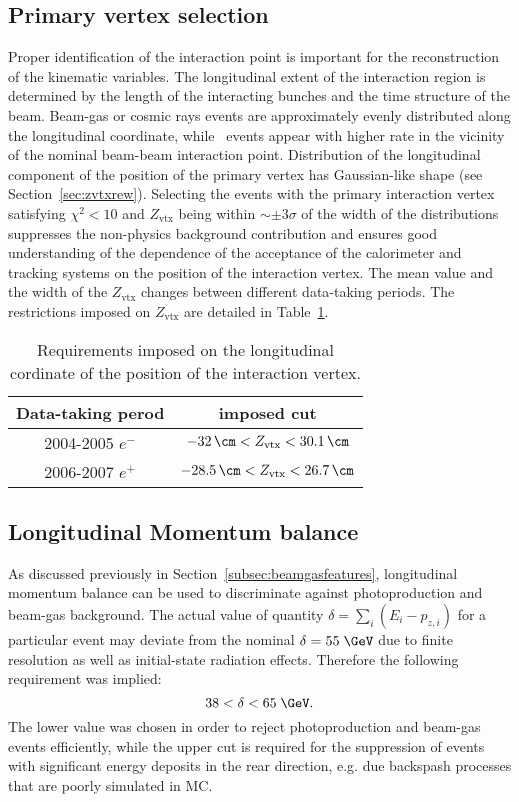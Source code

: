 \subsection{Primary vertex selection}
\label{subsec:vtxselect}
Proper identification of the interaction point is important for the reconstruction of the kinematic variables. The longitudinal extent of the interaction region is determined by the length of the interacting bunches and the time structure of the beam. Beam-gas or cosmic rays events are approximately evenly distributed along the longitudinal coordinate, while \ep\, events appear with higher rate in the vicinity of the nominal beam-beam interaction point. Distribution of the longitudinal component of the position of the primary vertex has Gaussian-like shape (see Section~\ref{sec:zvtxrew}). Selecting the events with the primary interaction vertex satisfying $\chi^2 < 10$ and $Z_\text{vtx}$ being within $\sim \pm 3\sigma$ of the width of the distributions suppresses the non-physics background contribution and ensures good understanding of the dependence of the acceptance of the calorimeter and tracking systems on the position of the interaction vertex. The mean value and the width of the $Z_\text{vtx}$ changes between different data-taking periods. The restrictions imposed on $Z_\text{vtx}$ are detailed in Table~\ref{tab:zvxcut}.
\begin{table}[htbp]
	\centering
		\begin{tabular}{|c|c|}
			\hline
			Data-taking perod & imposed cut \\
			\hline
			\hline
			2004-2005 $e^{-}$ & $-32\,\cm<Z_\text{vtx}<30.1\,\cm$ \\
			2006-2007 $e^{+}$ & $-28.5\,\cm<Z_\text{vtx}<26.7\,\cm$ \\
			\hline
		\end{tabular}
	\caption{Requirements imposed on the longitudinal cordinate of the position of the interaction vertex.}
	\label{tab:zvxcut}
\end{table}

\subsection{Longitudinal Momentum balance}
\label{subsec:empzcut}
As discussed previously in Section~\ref{subsec:beamgasfeatures}, longitudinal momentum balance can be used to discriminate against photoproduction and beam-gas background. The actual value of quantity $\delta=\sum_i{\left(E_i-p_{z,i}\right)}$ for a particular event may deviate from the nominal $\delta=55\;\GeV$ due to finite resolution as well as initial-state radiation effects. Therefore the following requirement was implied:
\begin{equation}
38 < \delta < 65\;\GeV.
\label{eq:epmzcut}
\end{equation}
The lower value was chosen in order to reject photoproduction and beam-gas events efficiently, while the upper cut is required for the suppression of events with significant energy deposits in the rear direction, e.g. due backspash processes that are poorly simulated in MC.

